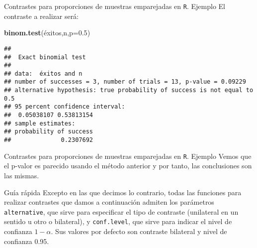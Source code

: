 \documentclass[
  ignorenonframetext,
]{beamer}
\newenvironment{Shaded}{\begin{snugshade}}{\end{snugshade}}
\newcommand{\DataTypeTok}[1]{\textcolor[rgb]{0.13,0.29,0.53}{#1}}
\newcommand{\FloatTok}[1]{\textcolor[rgb]{0.00,0.00,0.81}{#1}}
\newcommand{\KeywordTok}[1]{\textcolor[rgb]{0.13,0.29,0.53}{\textbf{#1}}}
\newcommand{\NormalTok}[1]{#1}
\begin{document}
\begin{frame}[fragile]{Contrastes para proporciones de muestras
emparejadas en \texttt{R}. Ejemplo}
\protect\hypertarget{contrastes-para-proporciones-de-muestras-emparejadas-en-r.-ejemplo-7}{}
El contraste a realizar será:

\begin{Shaded}
\begin{Highlighting}[]
\KeywordTok{binom.test}\NormalTok{(éxitos,n,}\DataTypeTok{p=}\FloatTok{0.5}\NormalTok{)}
\end{Highlighting}
\end{Shaded}

\begin{verbatim}
## 
##  Exact binomial test
## 
## data:  éxitos and n
## number of successes = 3, number of trials = 13, p-value = 0.09229
## alternative hypothesis: true probability of success is not equal to 0.5
## 95 percent confidence interval:
##  0.05038107 0.53813154
## sample estimates:
## probability of success 
##              0.2307692
\end{verbatim}
\end{frame}

\begin{frame}{Contrastes para proporciones de muestras emparejadas en
\texttt{R}. Ejemplo}
\protect\hypertarget{contrastes-para-proporciones-de-muestras-emparejadas-en-r.-ejemplo-8}{}
Vemos que el p-valor es parecido usando el método anterior y por tanto,
las conclusiones son las mismas.
\end{frame}

\begin{frame}[fragile]{Guía rápida}
\protect\hypertarget{guuxeda-ruxe1pida}{}
Excepto en las que decimos lo contrario, todas las funciones para
realizar contrastes que damos a continuación admiten los parámetros
\texttt{alternative}, que sirve para especificar el tipo de contraste
(unilateral en un sentido u otro o bilateral), y \texttt{conf.level},
que sirve para indicar el nivel de confianza \(1-\alpha\). Sus valores
por defecto son contraste bilateral y nivel de confianza 0.95.
\end{frame}
\end{document}
